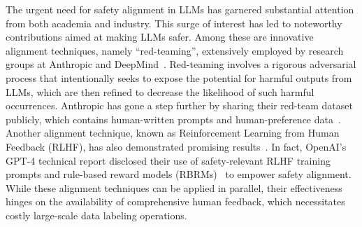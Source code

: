 \documentclass{article}
\begin{document}
The urgent need for safety alignment in LLMs has garnered substantial attention from both academia and industry. This surge of interest has led to noteworthy contributions aimed at making LLMs safer. Among these are innovative alignment techniques, namely ``red-teaming'', extensively employed by research groups at Anthropic and DeepMind~\cite{Perez2022-mk, Ganguli2022-td}. Red-teaming involves a rigorous adversarial process that intentionally seeks to expose the potential for harmful outputs from LLMs, which are then refined to decrease the likelihood of such harmful occurrences. Anthropic has gone a step further by sharing their red-team dataset publicly, which contains human-written prompts and human-preference data~\cite{Ganguli2022-td}. Another alignment technique, known as Reinforcement Learning from Human Feedback (RLHF), has also demonstrated promising results~\cite{Ouyang2022-lg, Bai2022-mt, katz2023gpt}. In fact, OpenAI's GPT-4 technical report disclosed their use of safety-relevant RLHF training prompts and rule-based reward models (RBRMs)~\cite{katz2023gpt} to empower safety alignment. While these alignment techniques can be applied in parallel, their effectiveness hinges on the availability of comprehensive human feedback, which necessitates costly large-scale data labeling operations.
\end{document}
